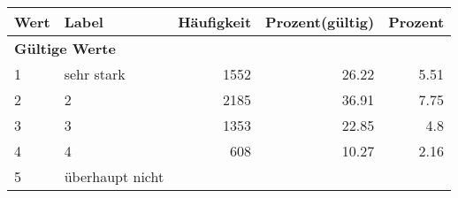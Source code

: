     \begin{longtable}{lXrrr}
     \toprule
     \textbf{Wert} & \textbf{Label} & \textbf{Häufigkeit} & \textbf{Prozent(gültig)} & \textbf{Prozent} \\
     \endhead
     \midrule
     \multicolumn{5}{l}{\textbf{Gültige Werte}}\\

     1 &
     \multicolumn{1}{X}{ sehr stark   } &


       \num{1552} &
       \num[round-mode=places,round-precision=2]{26,22} &
         \num[round-mode=places,round-precision=2]{5,51} \\

     2 &
     \multicolumn{1}{X}{ 2   } &


       \num{2185} &
       \num[round-mode=places,round-precision=2]{36,91} &
         \num[round-mode=places,round-precision=2]{7,75} \\

     3 &
     \multicolumn{1}{X}{ 3   } &


       \num{1353} &
       \num[round-mode=places,round-precision=2]{22,85} &
         \num[round-mode=places,round-precision=2]{4,8} \\

     4 &
     \multicolumn{1}{X}{ 4   } &


       \num{608} &
       \num[round-mode=places,round-precision=2]{10,27} &
         \num[round-mode=places,round-precision=2]{2,16} \\

     5 &
     \multicolumn{1}{X}{ überhaupt nicht   } &



\end{longtable}
